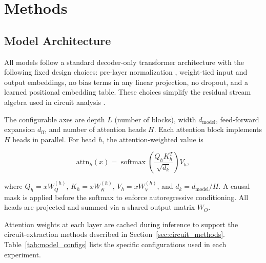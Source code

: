
\section{Methods}
\label{sec:methods}

\subsection{Model Architecture}
\label{sec:arch}

All models follow a standard decoder-only transformer architecture \cite{vaswani2017attention,radford2019language}
with the following fixed design choices: pre-layer normalization \cite{xiong2020layer}, weight-tied
input and output embeddings, no bias terms in any linear projection, no dropout, and a learned positional
embedding table. These choices simplify the residual stream algebra used in circuit analysis
\cite{elhage2021mathematical}.

The configurable axes are depth $L$ (number of blocks), width $d_{\text{model}}$, feed-forward
expansion $d_{\text{ff}}$, and number of attention heads $H$. Each attention block implements
$H$ heads in parallel. For head $h$, the attention-weighted value is

\begin{equation}
\label{eq:attn}
\text{attn}_h(x) = \operatorname{softmax}\!\left(\frac{Q_h K_h^T}{\sqrt{d_k}}\right) V_h,
\end{equation}

\noindent where $Q_h = x W_Q^{(h)}$, $K_h = x W_K^{(h)}$, $V_h = x W_V^{(h)}$, and
$d_k = d_{\text{model}} / H$. A causal mask is applied before the softmax to enforce
autoregressive conditioning. All heads are projected and summed via a shared output matrix $W_O$.

Attention weights at each layer are cached during inference to support the circuit-extraction
methods described in Section~\ref{sec:circuit_methods}. Table~\ref{tab:model_configs} lists
the specific configurations used in each experiment.

